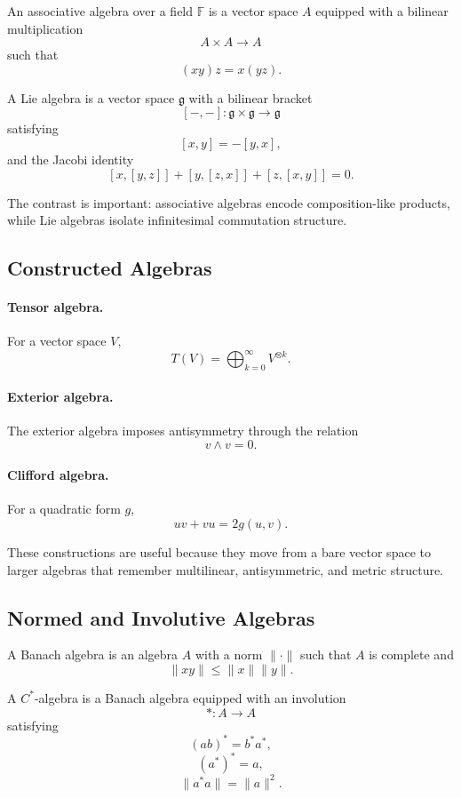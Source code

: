 \documentclass[11pt]{article}
\newcommand{\F}{\mathbb{F}}
\newcommand{\g}{\mathfrak{g}}
\begin{document}
An associative algebra over a field \(\F\) is a vector space \(A\) equipped with
a bilinear multiplication
\[
  A \times A \to A
\]
such that
\[
  (xy)z = x(yz).
\]

A Lie algebra is a vector space \(\g\) with a bilinear bracket
\[
  [-,-] : \g \times \g \to \g
\]
satisfying
\[
  [x,y] = -[y,x],
\]
and the Jacobi identity
\[
  [x,[y,z]] + [y,[z,x]] + [z,[x,y]] = 0.
\]

The contrast is important: associative algebras encode composition-like
products, while Lie algebras isolate infinitesimal commutation structure.

\subsection{Constructed Algebras}

\paragraph{Tensor algebra.}
For a vector space \(V\),
\[
  T(V) = \bigoplus_{k=0}^{\infty} V^{\otimes k}.
\]

\paragraph{Exterior algebra.}
The exterior algebra imposes antisymmetry through the relation
\[
  v \wedge v = 0.
\]

\paragraph{Clifford algebra.}
For a quadratic form \(g\),
\[
  uv + vu = 2g(u,v).
\]

These constructions are useful because they move from a bare vector space to
larger algebras that remember multilinear, antisymmetric, and metric structure.

\subsection{Normed and Involutive Algebras}

A Banach algebra is an algebra \(A\) with a norm \(\|\cdot\|\) such that \(A\)
is complete and
\[
  \|xy\| \le \|x\| \|y\|.
\]

A \(C^*\)-algebra is a Banach algebra equipped with an involution
\[
  * : A \to A
\]
satisfying
\[
  (ab)^* = b^* a^*,
\]
\[
  (a^*)^* = a,
\]
\[
  \|a^* a\| = \|a\|^2.
\]
\end{document}
